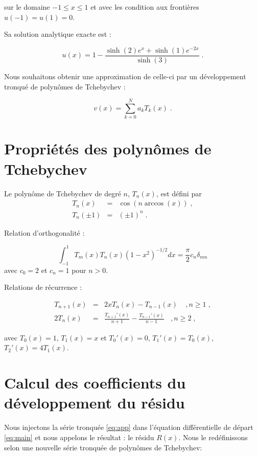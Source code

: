 \documentclass{report}
\begin{document}
sur le domaine $-1\leq x \leq 1$ et avec les condition aux frontières $u(-1)=u(1)=0$.

Sa solution analytique exacte est :

\begin{equation}
u(x) = 1- \frac{\sinh(2)e^{x}+\sinh(1)e^{-2x}}{\sinh(3)}\;.
\end{equation}

Nous souhaitons obtenir une approximation de celle-ci par un développement tronqué de polynômes de Tchebychev :

\begin{equation}\label{eq:app}
v(x) = \sum_{k=0}^N a_k T_k(x) \;.
\end{equation}


\section{Propriétés des polynômes de Tchebychev}

Le polynôme de Tchebychev de degré $n$, $T_n(x)$, est défini par
\begin{eqnarray}
T_n(x) &=& \cos (n\arccos(x))\;, \label{T_def}\\
T_n(\pm1) &=& (\pm1)^n\;.\label{eq+-1}
\end{eqnarray}

Relation d'orthogonalité :

\begin{equation}\label{ortho}
\int_{-1}^{1} T_m(x) T_n(x) (1-x^2)^{-1/2} dx = \frac{\pi}{2} c_n \delta_{mn}
\end{equation}
avec $c_0=2$ et $c_n = 1$ pour $n>0$.

Relations de récurrence :

\begin{eqnarray}
T_{n+1}(x) & = & 2xT_n(x) - T_{n-1}(x) \ \ \ \ \ , n \geq 1\;,\\
2T_n (x) & = & \frac{T_{n+1}'(x)}{n+1} - \frac{T_{n-1}'(x)}{n-1} \ \ \ \ , n \geq 2\;,\label{eq:rec}
\end{eqnarray}

avec $T_0 (x) = 1$, $T_1 (x) = x$ et $T_0' (x) = 0$, $T_1' (x) = T_0 (x)$, $T_2' (x) = 4T_1 (x)$.

\section{Calcul des coefficients du développement du résidu}

Nous injectons la série tronquée \eqref{eq:app} dans l'équation différentielle de départ \eqref{eq:main} et nous appelons le résultat : le résidu $R(x)$. Nous le redéfinissons selon une nouvelle série tronquée de polynômes de Tchebychev:
\end{document}
